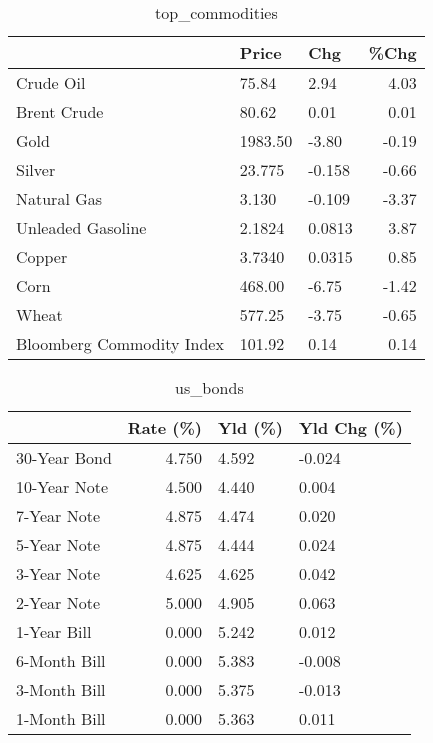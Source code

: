 \documentclass{article}%
\begin{document}
\begin{table}[htbp]%
\caption{top\_commodities}%
\centering%
\begin{adjustbox}{width=1\textwidth}%
\begin{tabular}{lllr}
\toprule
                          &   Price &    Chg &  \%Chg \\
\midrule
               Crude Oil  &   75.84 &   2.94 &  4.03 \\
             Brent Crude  &   80.62 &   0.01 &  0.01 \\
                    Gold  & 1983.50 &  -3.80 & -0.19 \\
                  Silver  &  23.775 & -0.158 & -0.66 \\
             Natural Gas  &   3.130 & -0.109 & -3.37 \\
       Unleaded Gasoline  &  2.1824 & 0.0813 &  3.87 \\
                  Copper  &  3.7340 & 0.0315 &  0.85 \\
                    Corn  &  468.00 &  -6.75 & -1.42 \\
                   Wheat  &  577.25 &  -3.75 & -0.65 \\
Bloomberg Commodity Index &  101.92 &   0.14 &  0.14 \\
\bottomrule
\end{tabular}
%
\end{adjustbox}%
\end{table}

%


\begin{table}[htbp]%
\caption{us\_bonds}%
\centering%
\begin{adjustbox}{width=1\textwidth}%
\begin{tabular}{lrll}
\toprule
             &  Rate (\%) & Yld (\%) & Yld Chg (\%) \\
\midrule
30-Year Bond &     4.750 &   4.592 &      -0.024 \\
10-Year Note &     4.500 &   4.440 &       0.004 \\
 7-Year Note &     4.875 &   4.474 &       0.020 \\
 5-Year Note &     4.875 &   4.444 &       0.024 \\
 3-Year Note &     4.625 &   4.625 &       0.042 \\
 2-Year Note &     5.000 &   4.905 &       0.063 \\
 1-Year Bill &     0.000 &   5.242 &       0.012 \\
6-Month Bill &     0.000 &   5.383 &      -0.008 \\
3-Month Bill &     0.000 &   5.375 &      -0.013 \\
1-Month Bill &     0.000 &   5.363 &       0.011 \\
\bottomrule
\end{tabular}
%
\end{adjustbox}%
\end{table}
\end{document}
